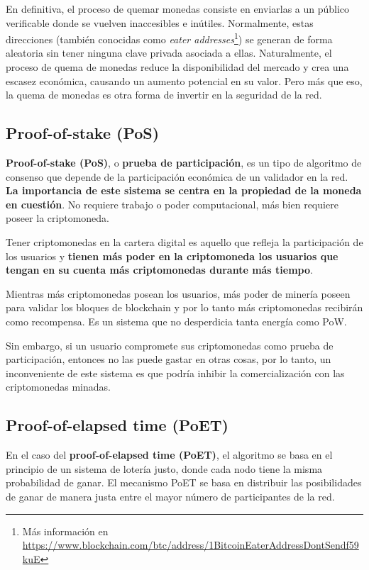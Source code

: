 \documentclass[10pt, a4paper]{article}
\theoremstyle{theorem-style}
\theoremstyle{theorem-style}
\theoremstyle{definition-style}
\theoremstyle{remark-style}
\theoremstyle{example-style}
\theoremstyle{definition-style}
\theoremstyle{remark-style}
\begin{document}
En definitiva, el proceso de quemar monedas consiste en enviarlas a un público verificable donde se vuelven inaccesibles e inútiles. Normalmente, estas direcciones (también conocidas como \emph{eater addresses}\footnote{Más información en \url{https://www.blockchain.com/btc/address/1BitcoinEaterAddressDontSendf59kuE}}) se generan de forma aleatoria sin tener ninguna clave privada asociada a ellas. Naturalmente, el proceso de quema de monedas reduce la disponibilidad del mercado y crea una escasez económica, causando un aumento potencial en su valor. Pero más que eso, la quema de monedas es otra forma de invertir en la seguridad de la red.

\subsection{Proof-of-stake (PoS)}\label{proof-of-stake}

\textbf{Proof-of-stake (PoS)}, o \textbf{prueba de participación}, es un tipo de algoritmo de consenso que depende de la participación económica de un validador en la red. \textbf{La importancia de este sistema se centra en la propiedad de la moneda en cuestión}. No requiere trabajo o poder computacional, más bien requiere poseer la criptomoneda.


Tener criptomonedas en la cartera digital es aquello que refleja la participación de los usuarios y \textbf{tienen más poder en la criptomoneda los usuarios que tengan en su cuenta más criptomonedas durante más tiempo}.

Mientras más criptomonedas posean los usuarios, más poder de minería poseen para validar los bloques de blockchain y por lo tanto más criptomonedas recibirán como recompensa. Es un sistema que no desperdicia tanta energía como PoW.

Sin embargo, si un usuario compromete sus criptomonedas como prueba de participación, entonces no las puede gastar en otras cosas, por lo tanto, un inconveniente de este sistema es que podría inhibir la comercialización con las criptomonedas minadas.

\subsection{Proof-of-elapsed time (PoET)}\label{proof-of-elapsed-time}

En el caso del \textbf{proof-of-elapsed time (PoET)}, el algoritmo se basa en el principio de un sistema de lotería justo, donde cada nodo tiene la misma probabilidad de ganar. El mecanismo PoET se basa en distribuir las posibilidades de ganar de manera justa entre el mayor número de participantes de la red.
\end{document}

